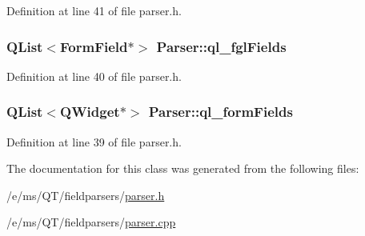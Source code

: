 Definition at line 41 of file parser.h.

\hypertarget{classParser_a2cc0ce2919a5f45d55cab55a9e3c8b28}{
\subsubsection[{ql\_\-fglFields}]{\setlength{\rightskip}{0pt plus 5cm}QList$<${\bf FormField}$\ast$$>$ {\bf Parser::ql\_\-fglFields}}}
\label{classParser_a2cc0ce2919a5f45d55cab55a9e3c8b28}


Definition at line 40 of file parser.h.

\hypertarget{classParser_a457a6f19e0594ed8a745c8a00be32c4b}{
\subsubsection[{ql\_\-formFields}]{\setlength{\rightskip}{0pt plus 5cm}QList$<$QWidget$\ast$$>$ {\bf Parser::ql\_\-formFields}}}
\label{classParser_a457a6f19e0594ed8a745c8a00be32c4b}


Definition at line 39 of file parser.h.



The documentation for this class was generated from the following files:\begin{DoxyCompactItemize}
\item 
/e/ms/QT/fieldparsers/\hyperlink{parser_8h}{parser.h}\item 
/e/ms/QT/fieldparsers/\hyperlink{parser_8cpp}{parser.cpp}\end{DoxyCompactItemize}
